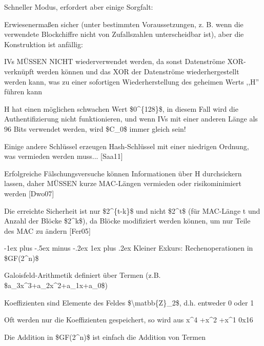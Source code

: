 \documentclass[a4paper]{article}
\makeatletter
\renewcommand{\subsubsection}{\@startsection{subsubsection}{3}{0mm}%
 {-1ex plus -.5ex minus -.2ex}%
 {1ex plus .2ex}%
 {\normalfont\small\bfseries}}
\makeatother
\begin{document}
\begin{multicols}{3}
\begin{itemize*}
            \begin{itemize*}
                  \item Schneller Modus, erfordert aber einige Sorgfalt:
                  \begin{itemize*} \item Erwiesenermaßen sicher (unter bestimmten Voraussetzungen, z. B. wenn die verwendete Blockchiffre nicht von Zufallszahlen unterscheidbar ist), aber die Konstruktion ist anfällig: \end{itemize*}
                  \item IVs MÜSSEN NICHT wiederverwendet werden, da sonst Datenströme XOR-verknüpft werden können und das XOR der Datenströme wiederhergestellt werden kann, was zu einer sofortigen Wiederherstellung des geheimen Werts ,,H'' führen kann
                  \item H hat einen möglichen schwachen Wert \$0\^{}\{128\}\$, in diesem Fall wird die Authentifizierung nicht funktionieren, und wenn IVs mit einer anderen Länge als 96 Bits verwendet werden, wird \$C\_0\$ immer gleich sein!
                  \item Einige andere Schlüssel erzeugen Hash-Schlüssel mit einer niedrigen Ordnung, was vermieden werden muss... {[}Saa11{]}
                  \item Erfolgreiche Fälschungsversuche können Informationen über H durchsickern lassen, daher MÜSSEN kurze MAC-Längen vermieden oder risikominimiert werden {[}Dwo07{]}
                  \item Die erreichte Sicherheit ist nur \$2\^{}\{t-k\}\$ und nicht \$2\^{}t\$ (für MAC-Länge t und Anzahl der Blöcke \$2\^{}k\$), da Blöcke modifiziert werden können, um nur Teile des MAC zu ändern {[}Fer05{]}
            \end{itemize*}
      \end{itemize*}


      \subsubsection{Kleiner Exkurs: Rechenoperationen in
      \$GF(2\^{}n)\$}

      \begin{itemize*}
            \item
            Galoisfeld-Arithmetik definiert über Termen (z.B.
            \$a\_3x\^{}3+a\_2x\^{}2+a\_1x+a\_0\$)
            \item
            Koeffizienten sind Elemente des Feldes
            \$\textbackslash matbb\{Z\}\_2\$, d.h. entweder 0 oder 1
            \item
            Oft werden nur die Koeffizienten gespeichert, so wird aus x\^{}4
            +x\^{}2 +x\^{}1 0x16
            \item
            Die Addition in \$GF(2\^{}n)\$ ist einfach die Addition von Termen


\end{itemize*}
\end{multicols}
\end{document}
